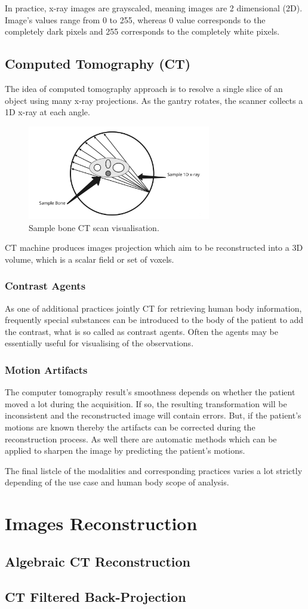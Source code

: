 In practice, x-ray images are grayscaled, meaning images are 2 dimensional (2D). Image's values range from 0 to 255, whereas 0 value corresponds to the completely dark pixels and 255 corresponds to the completely white pixels.


\subsection{Computed Tomography (CT)}
The idea of computed tomography approach is to resolve a single slice of an object using many x-ray projections. As the gantry rotates, the scanner collects a 1D x-ray at each angle.

\begin{figure}[h]
    \centering \includegraphics[width=8cm]{images/ct-scan-sample.jpeg}
    \caption {Sample bone CT scan visualisation.}
\end{figure}

CT machine produces images projection which aim to be reconstructed into a 3D volume, which is a scalar field or set of voxels. 

\subsubsection{Contrast Agents}
As one of additional practices jointly CT for retrieving human body information, frequently special substances can be introduced to the body of the patient to add the contrast, what is so called as contrast agents. Often the agents may be essentially useful for visualising of the observations.          

\subsubsection{Motion Artifacts}
The computer tomography result's smoothness depends on whether the patient moved a lot during the acquisition. If so, the resulting transformation will be inconsistent and the reconstructed image will contain errors. But, if the patient's motions are known thereby the artifacts can be corrected during the reconstruction process. As well there are automatic methods which can be applied to sharpen the image by predicting the patient's motions.

The final listcle of the modalities and corresponding practices varies a lot strictly depending of the use case and human body scope of analysis.

\section{Images Reconstruction}

\subsection{Algebraic CT Reconstruction}

\subsection{CT Filtered Back-Projection}

